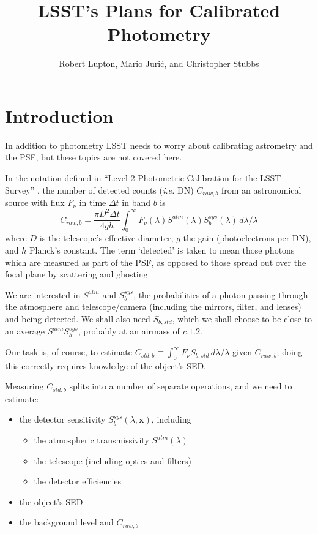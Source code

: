 \documentclass[12pt]{article}
\renewcommand{\c}{\textit{c.}\xspace}
\newcommand{\ie}{\textit{i.e.}\xspace}
\newcommand{\xb}{{\boldsymbol x}}
\begin{document}
\title{LSST's Plans for Calibrated Photometry}
\author{Robert Lupton, Mario Juri\'c, and Christopher Stubbs}
\maketitle
\tableofcontents

\section{Introduction}

In addition to photometry LSST needs to worry about calibrating astrometry and the PSF, but these
topics are not covered here.

In the notation defined in
``Level 2 Photometric Calibration for the LSST Survey'' \cite{LSE-180}.
the number of detected counts (\ie DN) $C_{raw, b}$ from an astronomical source with flux
$F_\nu$ in time $\Delta t$ in band $b$ is
$$
C_{raw, b} = \frac{\pi D^2 \Delta t}{4 g h} \int_0^\infty F_\nu(\lambda)
                                                   S^{atm}(\lambda) S_b^{sys}(\lambda) \,d\lambda/\lambda
$$
where $D$ is the telescope's effective diameter, $g$ the gain (photoelectrons per DN),
and $h$ Planck's constant.  The term `detected' is taken to mean those photons which are measured
as part of the PSF, as opposed to those spread out over the focal plane by scattering and ghosting.

We are interested in $S^{atm}$ and $S_b^{sys}$, the probabilities of a photon passing through 
the atmosphere and telescope/camera (including the mirrors, filter, and lenses) and being detected.  We shall
also need $S_{b, std}$, which we shall choose to be close to an average $S^{atm} S_b^{sys}$, probably
at an airmass of \c $1.2$.

Our task is, of course, to estimate $C_{std, b} \equiv \int_0^\infty F_\nu S_{b, std} \,d\lambda/\lambda$
given $C_{raw, b}$; doing this correctly requires knowledge of the object's SED.

Measuring $C_{std, b}$ splits into a number of separate operations, and we need to estimate:
\begin{itemize}
\item
  the detector sensitivity $S_b^{sys}(\lambda, \xb)$, including

  \begin{itemize}
  \item
    the atmospheric transmissivity $S^{atm}(\lambda)$
  \item
    the telescope (including optics and filters)
  \item
    the detector efficiencies
  \end{itemize}
  \item
  the object's SED
\item
  the background level and $C_{raw, b}$
\end{itemize}
\end{document}
